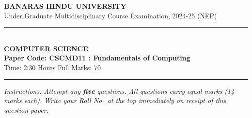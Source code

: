 \documentclass[11pt,a4paper]{article}
\begin{document}
\begin{center}
  {\large\bfseries BANARAS HINDU UNIVERSITY}\\[2pt]
  {\normalsize Under Graduate Multidisciplinary Course Examination, 2024-25 (NEP)}\\[6pt]
  \rule{0.8\linewidth}{0.5pt}\\[6pt]
  {\large\bfseries COMPUTER SCIENCE}\\[4pt]
  {\large\bfseries Paper Code: CSCMD11 : Fundamentals of Computing}\\[4pt]
  {\normalsize Time: 2:30 Hours \hfill Full Marks: 70}
\end{center}
\rule{\linewidth}{0.4pt}
\smallskip

\noindent \textit{Instructions: Attempt any \textbf{five} questions. All questions carry equal marks (14 marks each). Write your Roll No.\ at the top immediately on receipt of this question paper.}

\bigskip
\end{document}
